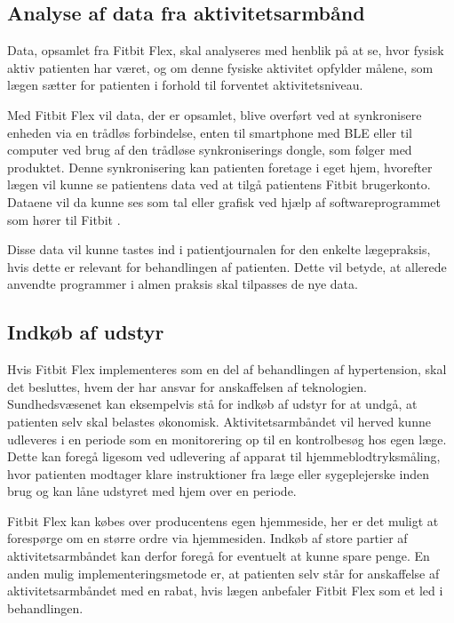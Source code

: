 \subsection{Analyse af data fra aktivitetsarmbånd}  
Data, opsamlet fra Fitbit Flex, skal analyseres med henblik på at se, hvor fysisk aktiv patienten har været, og om denne fysiske aktivitet opfylder målene, som lægen sætter for patienten i forhold til forventet aktivitetsniveau. 

Med Fitbit Flex vil data, der er opsamlet, blive overført ved at synkronisere enheden via en trådløs forbindelse, enten til smartphone med BLE eller til computer ved brug af den trådløse synkroniserings dongle, som følger med produktet. Denne synkronisering kan patienten foretage i eget hjem, hvorefter lægen vil kunne se patientens data  ved at tilgå patientens Fitbit brugerkonto. Dataene vil da kunne ses som tal eller grafisk ved hjælp af softwareprogrammet som hører til Fitbit \citep{fitbitflex}. 

Disse data vil kunne tastes ind i patientjournalen for den enkelte lægepraksis, hvis dette er relevant for behandlingen af patienten. Dette vil betyde, at allerede anvendte programmer i almen praksis skal tilpasses de nye data. 

\subsection{Indkøb af udstyr}	

Hvis Fitbit Flex implementeres som en del af behandlingen af hypertension, skal det besluttes, hvem der har ansvar for anskaffelsen af teknologien. Sundhedsvæsenet kan eksempelvis stå for indkøb af udstyr for at undgå, at patienten selv skal belastes økonomisk. Aktivitetsarmbåndet vil herved kunne udleveres i en periode som en monitorering op til en kontrolbesøg hos egen læge. Dette kan foregå ligesom ved udlevering af apparat til hjemmeblodtryksmåling, hvor patienten modtager klare instruktioner fra læge eller sygeplejerske inden brug og kan låne udstyret med hjem over en periode.

Fitbit Flex kan købes over producentens egen hjemmeside, her er det muligt at forespørge om en større ordre via hjemmesiden. Indkøb af store partier af aktivitetsarmbåndet kan derfor foregå for eventuelt at kunne spare penge. En anden mulig implementeringsmetode er, at patienten selv står for anskaffelse af aktivitetsarmbåndet med en rabat, hvis lægen anbefaler Fitbit Flex som et led i behandlingen.  

